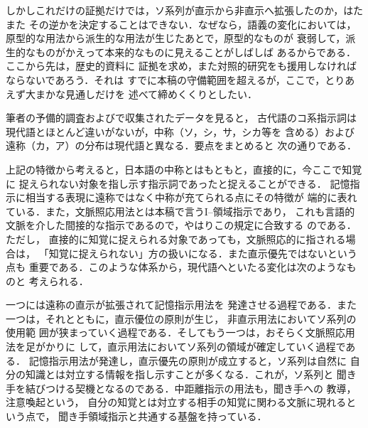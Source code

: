 しかしこれだけの証拠だけでは，ソ系列が直示から非直示へ拡張したのか，はたまた
その逆かを決定することはできない．なぜなら，語義の変化においては，
原型的な用法から派生的な用法が生じたあとで，原型的なものが
衰弱して，派生的なものがかえって本来的なものに見えることがしばしば
あるからである．
ここから先は，歴史的資料に
証拠を求め，また対照的研究をも援用しなければならないであろう．それは
すでに本稿の守備範囲を超えるが，ここで，とりあえず大まかな見通しだけを
述べて締めくくりとしたい．

筆者の予備的調査およびで収集されたデータを見ると，
古代語のコ系指示詞は現代語とほとんど違いがないが，中称（ソ，シ，サ，シカ等を
含める）および遠称（カ，ア）の分布は現代語と異なる．要点をまとめると
次の通りである．


上記の特徴から考えると，日本語の中称とはもともと，直接的に，今ここで知覚に
捉えられない対象を指し示す指示詞であったと捉えることができる．
記憶指示に相当する表現に遠称ではなく中称が充てられる点にその特徴が
端的に表れている．また，文脈照応用法とは本稿で言うI--領域指示であり，
これも言語的文脈を介した間接的な指示であるので，やはりこの規定に合致する
のである．ただし，
直接的に知覚に捉えられる対象であっても，文脈照応的に指される場合は，
「知覚に捉えられない」方の扱いになる．また直示優先ではないという点も
重要である．このような体系から，現代語へといたる変化は次のようなものと
考えられる．

一つには遠称の直示が拡張されて記憶指示用法を
発達させる過程である．また一つは，それとともに，直示優位の原則が生じ，
非直示用法においてソ系列の使用範
囲が狭まっていく過程である．そしてもう一つは，おそらく文脈照応用法を足がかりに
して，直示用法においてソ系列の領域が確定していく過程である．
記憶指示用法が発達し，直示優先の原則が成立すると，ソ系列は自然に
自分の知識とは対立する情報を指し示すことが多くなる．これが，ソ系列と
聞き手を結びつける契機となるのである．中距離指示の用法も，聞き手への
教導，注意喚起という，
自分の知覚とは対立する相手の知覚に関わる文脈に現れるという点で，
聞き手領域指示と共通する基盤を持っている．

